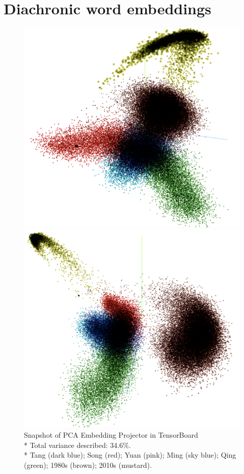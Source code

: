 \section{Diachronic word embeddings}
\begin{figure}[H]
\centering
\begin{minipage}[b]{0.45\linewidth}
  \includegraphics[width=\textwidth]{figures/pca_embedding_projector}
\end{minipage}
\quad
\begin{minipage}[b]{0.45\linewidth}
  \includegraphics[width=\textwidth]{figures/pca_embedding_projector_2}
\end{minipage}
\caption[Snapshot of PCA Embedding Projector in TensorBoard]{Snapshot of PCA Embedding Projector in TensorBoard\\\footnotesize{* Total variance described: 34.6\%.\\* Tang (dark blue); Song (red); Yuan (pink); Ming (sky blue); Qing (green); 1980s (brown); 2010s (mustard).}}
\end{figure}

